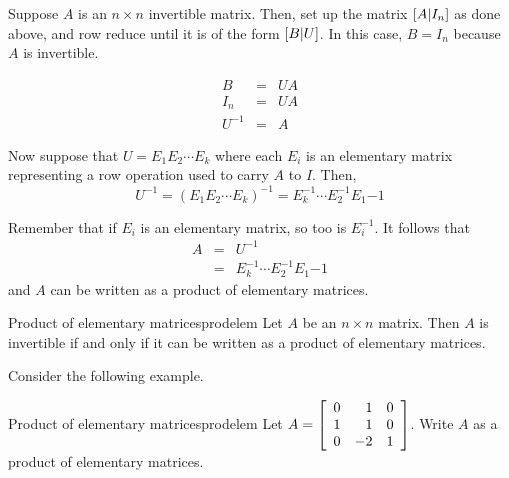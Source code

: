 Suppose $A$ is an $n \times n$ invertible matrix. Then, set up the matrix $\left[ A | I_n \right]$ as done above, and row reduce until it is of the form $\left[ B | U \right]$. In this case, $B = I_n$ because $A$ is invertible. 

\begin{eqnarray*}
B &=& UA \\
I_n &=& UA \\
U^{-1} &=& A 
\end{eqnarray*}

Now suppose that $U = E_1 E_2 \cdots E_k$ where each $E_i$ is an elementary matrix representing a row operation used to carry $A$ to $I$. Then, 
\[
U^{-1} = \left( E_1 E_2 \cdots E_k \right) ^{-1}  =  E_k^{-1} \cdots E_2^{-1} E_1{-1} 
\]

Remember that if $E_i$ is an elementary matrix, so too is $E_i^{-1}$. 
It follows that 
\begin{eqnarray*}
A&=& U^{-1} \\
&=&  E_k^{-1} \cdots E_2^{-1} E_1{-1}
\end{eqnarray*}
and $A$ can be written as a product of elementary matrices. 

\begin{theorem}{Product of elementary matrices}{prodelem}
Let $A$ be an $n \times n$ matrix. Then $A$ is invertible if and only if it can be written as a product of elementary matrices.
\end{theorem}

Consider the following example.

\begin{example}{Product of elementary matrices}{prodelem}
Let $A = \left[
\begin{array}{rrr}
0 & 1 & 0 \\
1 & 1 & 0 \\
0 & -2 & 1 
\end{array} \right]$. 
Write $A$ as a product of elementary matrices. 
\end{example}

